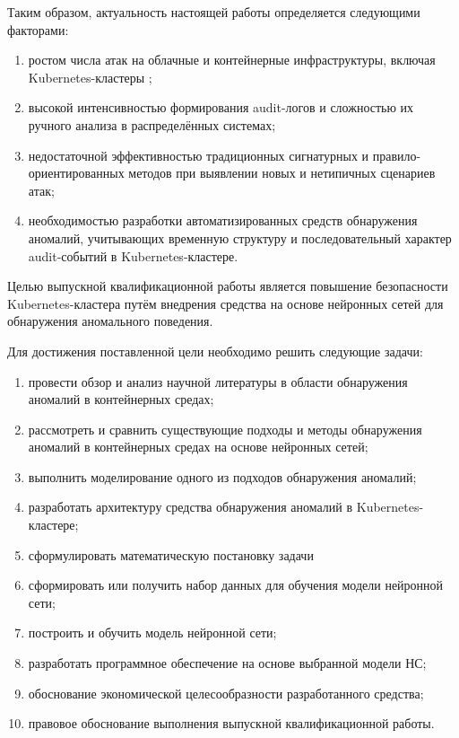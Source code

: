 Таким образом, актуальность настоящей работы определяется следующими факторами:

\begin{enumerate}
    \item ростом числа атак на облачные и контейнерные инфраструктуры, включая Kubernetes-кластеры \cite{Kubernetes_Security_Report};
    \item высокой интенсивностью формирования audit-логов и сложностью их ручного анализа в распределённых системах;
    \item недостаточной эффективностью традиционных сигнатурных и правило-ориентированных методов при выявлении новых и нетипичных сценариев атак;
    \item необходимостью разработки автоматизированных средств обнаружения аномалий, учитывающих временную структуру и последовательный характер audit-событий в Kubernetes-кластере.
\end{enumerate}

Целью выпускной квалификационной работы является повышение безопасности Kubernetes-кластера путём внедрения средства на основе нейронных сетей для обнаружения аномального поведения.

Для достижения поставленной цели необходимо решить следующие задачи:

\begin{enumerate}
    \item провести обзор и анализ научной литературы в области обнаружения аномалий в контейнерных средах;  
    \item рассмотреть и сравнить существующие подходы и методы обнаружения аномалий в контейнерных средах на основе нейронных сетей;
    \item выполнить моделирование одного из подходов обнаружения аномалий;
    \item разработать архитектуру средства обнаружения аномалий в Kubernetes-кластере;
    \item сформулировать математическую постановку задачи 
    \item сформировать или получить набор данных для обучения модели нейронной сети;
    \item построить и обучить модель нейронной сети;
    \item разработать программное обеспечение на основе выбранной модели НС;
    \item обоснование экономической целесообразности разработанного средства;
    \item правовое обоснование выполнения выпускной квалификационной работы. 
\end{enumerate}
